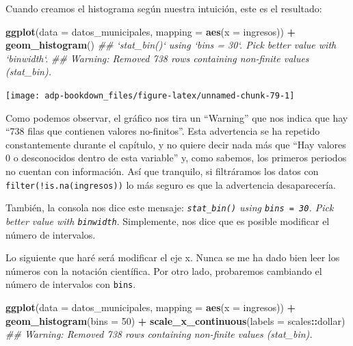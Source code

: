 \documentclass[]{book}
\newenvironment{Shaded}{\begin{snugshade}}{\end{snugshade}}
\newcommand{\CommentTok}[1]{\textcolor[rgb]{0.56,0.35,0.01}{\textit{#1}}}
\newcommand{\DataTypeTok}[1]{\textcolor[rgb]{0.13,0.29,0.53}{#1}}
\newcommand{\DecValTok}[1]{\textcolor[rgb]{0.00,0.00,0.81}{#1}}
\newcommand{\KeywordTok}[1]{\textcolor[rgb]{0.13,0.29,0.53}{\textbf{#1}}}
\newcommand{\NormalTok}[1]{#1}
\newcommand{\OperatorTok}[1]{\textcolor[rgb]{0.81,0.36,0.00}{\textbf{#1}}}
\newcommand{\StringTok}[1]{\textcolor[rgb]{0.31,0.60,0.02}{#1}}
\begin{document}
Cuando creamos el histograma según nuestra intuición, este es el
resultado:

\begin{Shaded}
\begin{Highlighting}[]
\KeywordTok{ggplot}\NormalTok{(}\DataTypeTok{data    =}\NormalTok{ datos_municipales, }
       \DataTypeTok{mapping =} \KeywordTok{aes}\NormalTok{(}\DataTypeTok{x =}\NormalTok{ ingresos)) }\OperatorTok{+}
\StringTok{  }\KeywordTok{geom_histogram}\NormalTok{()}
\CommentTok{## `stat_bin()` using `bins = 30`. Pick better value with `binwidth`.}
\CommentTok{## Warning: Removed 738 rows containing non-finite values (stat_bin).}
\end{Highlighting}
\end{Shaded}

\begin{center}\texttt{[image: adp-bookdown\_files/figure-latex/unnamed-chunk-79-1]} \end{center}

Como podemos observar, el gráfico nos tira un ``Warning'' que nos indica
que hay ``738 filas que contienen valores no-finitos''. Esta advertencia
se ha repetido constantemente durante el capítulo, y no quiere decir
nada más que ``Hay valores 0 o desconocidos dentro de esta variable'' y,
como sabemos, los primeros periodos no cuentan con información. Así que
tranquilo, si filtráramos los datos con
\texttt{filter(!is.na(ingresos))} lo más seguro es que la advertencia
desaparecería.

También, la consola nos dice este mensaje: \emph{\texttt{stat\_bin()}
using \texttt{bins\ =\ 30}. Pick better value with \texttt{binwidth}}.
Simplemente, nos dice que es posible modificar el número de intervalos.

Lo siguiente que haré será modificar el eje x. Nunca se me ha dado bien
leer los números con la notación científica. Por otro lado, probaremos
cambiando el número de intervalos con \texttt{bins}.

\begin{Shaded}
\begin{Highlighting}[]
\KeywordTok{ggplot}\NormalTok{(}\DataTypeTok{data    =}\NormalTok{ datos_municipales, }
       \DataTypeTok{mapping =} \KeywordTok{aes}\NormalTok{(}\DataTypeTok{x =}\NormalTok{ ingresos)) }\OperatorTok{+}
\StringTok{  }\KeywordTok{geom_histogram}\NormalTok{(}\DataTypeTok{bins =} \DecValTok{50}\NormalTok{) }\OperatorTok{+}
\StringTok{  }\KeywordTok{scale_x_continuous}\NormalTok{(}\DataTypeTok{labels =}\NormalTok{ scales}\OperatorTok{::}\NormalTok{dollar) }
\CommentTok{## Warning: Removed 738 rows containing non-finite values (stat_bin).}
\end{Highlighting}
\end{Shaded}
\end{document}
